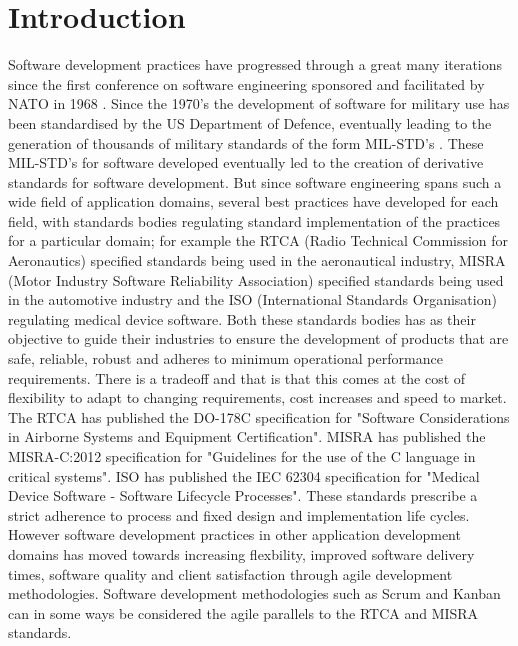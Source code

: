 \documentclass{sig-alternate-05-2015}
\begin{document}
\section{Introduction}
Software development practices have progressed through a great many iterations since the first conference on software engineering sponsored and facilitated by NATO in 1968 \cite{Bauer_1968}. Since the 1970's the development of software for military use has been standardised by the US Department of Defence, eventually leading to the generation of thousands of military standards of the form MIL-STD's \cite{McDonald_2010}. These MIL-STD's for software developed eventually led to the creation of derivative standards for software development. 
\break
\break
But since software engineering spans such a wide field of application domains, several best practices have developed for each field, with standards bodies regulating standard implementation of the practices for a particular domain; for example the RTCA (Radio Technical Commission for Aeronautics) specified standards being used in the aeronautical industry, MISRA (Motor Industry Software Reliability Association) specified standards being used in the automotive industry and the ISO (International Standards Organisation) regulating medical device software.  Both these standards bodies has as their objective to guide their industries to ensure the development of products that are safe, reliable, robust and adheres to minimum operational performance requirements. There is a tradeoff and that is that this comes at the cost of flexibility to adapt to changing requirements, cost increases and speed to market.
\break
\break
The RTCA has published the DO-178C \cite{RTCA_2012} specification for "Software Considerations in Airborne Systems and Equipment Certification". MISRA has published the MISRA-C:2012 \cite{MISRA_2012} specification for "Guidelines for the use of the C language in critical systems". ISO has published the IEC 62304 \cite{Jordan_2006} specification for "Medical Device Software - Software Lifecycle Processes".
\break
\break
These standards prescribe a strict adherence to process and fixed design and implementation life cycles. However software development practices in other application development domains has moved towards increasing flexbility, improved software delivery times, software quality and client satisfaction through agile development methodologies\cite{Armbrust_2011}. Software development methodologies such as Scrum and Kanban can in some ways be considered the agile parallels to the RTCA and MISRA standards.
\end{document}
